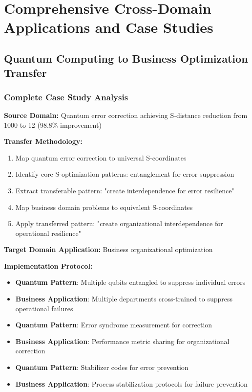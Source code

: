 \documentclass[11pt]{article}
\theoremstyle{definition}
\theoremstyle{remark}
\begin{document}
\section{Comprehensive Cross-Domain Applications and Case Studies}

\subsection{Quantum Computing to Business Optimization Transfer}

\subsubsection{Complete Case Study Analysis}

\textbf{Source Domain:} Quantum error correction achieving S-distance reduction from 1000 to 12 (98.8\% improvement)

\textbf{Transfer Methodology:}
\begin{enumerate}
\item Map quantum error correction to universal S-coordinates
\item Identify core S-optimization patterns: entanglement for error suppression
\item Extract transferable pattern: "create interdependence for error resilience"
\item Map business domain problems to equivalent S-coordinates
\item Apply transferred pattern: "create organizational interdependence for operational resilience"
\end{enumerate}

\textbf{Target Domain Application:} Business organizational optimization

\textbf{Implementation Protocol:}
\begin{itemize}
\item \textbf{Quantum Pattern}: Multiple qubits entangled to suppress individual errors
\item \textbf{Business Application}: Multiple departments cross-trained to suppress operational failures
\item \textbf{Quantum Pattern}: Error syndrome measurement for correction
\item \textbf{Business Application}: Performance metric sharing for organizational correction
\item \textbf{Quantum Pattern}: Stabilizer codes for error prevention
\item \textbf{Business Application}: Process stabilization protocols for failure prevention
\end{itemize}
\end{document}
